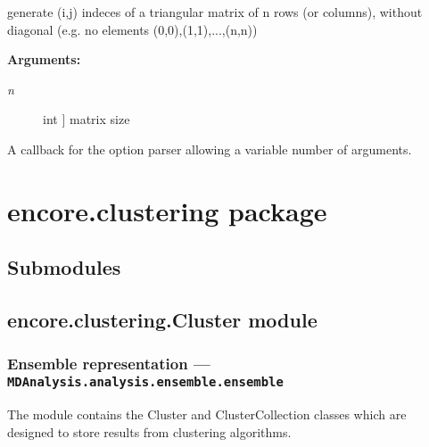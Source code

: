\documentclass[letterpaper,10pt,english]{sphinxmanual}
\begin{document}

\begin{fulllineitems}
\label{index:encore.utils.trm_indeces_nodiag}
generate (i,j) indeces of a triangular matrix of n rows (or columns), without diagonal (e.g. no elements (0,0),(1,1),...,(n,n))

\textbf{Arguments:}
\begin{description}
\item[{\emph{n}}] \leavevmode{[}int {]}
matrix size

\end{description}

\end{fulllineitems}


\begin{fulllineitems}
\label{index:encore.utils.vararg_callback}
A callback for the option parser allowing a variable number of arguments.

\end{fulllineitems}



\chapter{encore.clustering package}
\label{index:encore-clustering-package}

\section{Submodules}
\label{index:id11}

\section{encore.clustering.Cluster module}
\label{index:module-encore.clustering.Cluster}\label{index:encore-clustering-cluster-module}

\subsection{Ensemble representation --- \texttt{MDAnalysis.analysis.ensemble.ensemble}}
\label{index:id12}
The module contains the Cluster and ClusterCollection classes which are designed
to store results from clustering algorithms.
\end{document}

